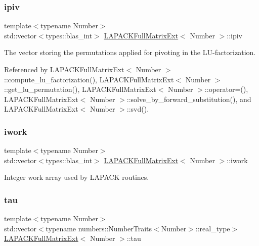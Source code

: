 \subsubsection{\texorpdfstring{ipiv}{ipiv}}
{\footnotesize\ttfamily template$<$typename Number$>$ \\
std\+::vector$<$types\+::blas\+\_\+int$>$ \hyperlink{classLAPACKFullMatrixExt}{L\+A\+P\+A\+C\+K\+Full\+Matrix\+Ext}$<$ Number $>$\+::ipiv\hspace{0.3cm}{\ttfamily [private]}}

The vector storing the permutations applied for pivoting in the L\+U-\/factorization. 

Referenced by L\+A\+P\+A\+C\+K\+Full\+Matrix\+Ext$<$ Number $>$\+::compute\+\_\+lu\+\_\+factorization(), L\+A\+P\+A\+C\+K\+Full\+Matrix\+Ext$<$ Number $>$\+::get\+\_\+lu\+\_\+permutation(), L\+A\+P\+A\+C\+K\+Full\+Matrix\+Ext$<$ Number $>$\+::operator=(), L\+A\+P\+A\+C\+K\+Full\+Matrix\+Ext$<$ Number $>$\+::solve\+\_\+by\+\_\+forward\+\_\+substitution(), and L\+A\+P\+A\+C\+K\+Full\+Matrix\+Ext$<$ Number $>$\+::svd().

\mbox{\label{classLAPACKFullMatrixExt_ac091f1f6af485b451c4c9398abb67230}} 
\subsubsection{\texorpdfstring{iwork}{iwork}}
{\footnotesize\ttfamily template$<$typename Number$>$ \\
std\+::vector$<$types\+::blas\+\_\+int$>$ \hyperlink{classLAPACKFullMatrixExt}{L\+A\+P\+A\+C\+K\+Full\+Matrix\+Ext}$<$ Number $>$\+::iwork\hspace{0.3cm}{\ttfamily [private]}}

Integer work array used by L\+A\+P\+A\+CK routines. \mbox{\label{classLAPACKFullMatrixExt_a91fb784892cbe9d24ad2062fbf642635}} 
\subsubsection{\texorpdfstring{tau}{tau}}
{\footnotesize\ttfamily template$<$typename Number$>$ \\
std\+::vector$<$typename numbers\+::\+Number\+Traits$<$Number$>$\+::real\+\_\+type$>$ \hyperlink{classLAPACKFullMatrixExt}{L\+A\+P\+A\+C\+K\+Full\+Matrix\+Ext}$<$ Number $>$\+::tau\hspace{0.3cm}{\ttfamily [private]}}

